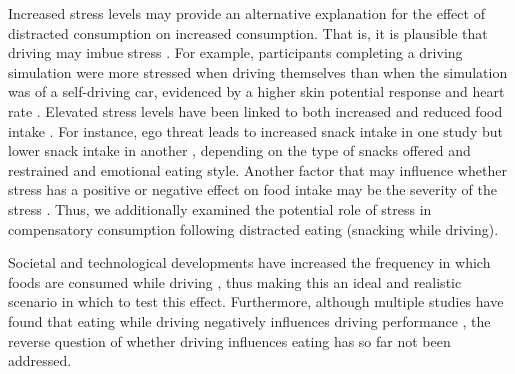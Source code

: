 \documentclass[authordate, empirical]{jote-new-article}
\begin{document}
Increased stress levels may provide an alternative explanation for the effect of distracted consumption on increased consumption. That is, it is plausible that driving may imbue stress \parencites{Antoun2017}. For example, participants completing a driving simulation were more stressed when driving themselves than when the simulation was of a self-driving car, evidenced by a higher skin potential response and heart rate \parencites{Zontone2020}. Elevated stress levels have been linked to both increased and reduced food intake \parencites{Reichenberger2018}{Torres2007}. For instance, ego threat leads to increased snack intake in one study \parencites{Wallis2004} but lower snack intake in another \parencites{Wallis2009}, depending on the type of snacks offered and restrained and emotional eating style. Another factor that may influence whether stress has a positive or negative effect on food intake may be the severity of the stress \parencites{Torres2007}. Thus, we additionally examined the potential role of stress in compensatory consumption following distracted eating (snacking while driving).



Societal and technological developments have increased the frequency in which foods \parencites[particularly high-calorie snacks][]{Hirschberg2016} are consumed while driving \parencites{Monitor2018}{Stutts2005}, thus making this an ideal and realistic scenario in which to test this effect. Furthermore, although multiple studies have found that eating while driving negatively influences driving performance \parencites{Dingus2016}{Irwin2015}{Young2008}, the reverse question of whether driving influences eating has so far not been addressed.
\end{document}
